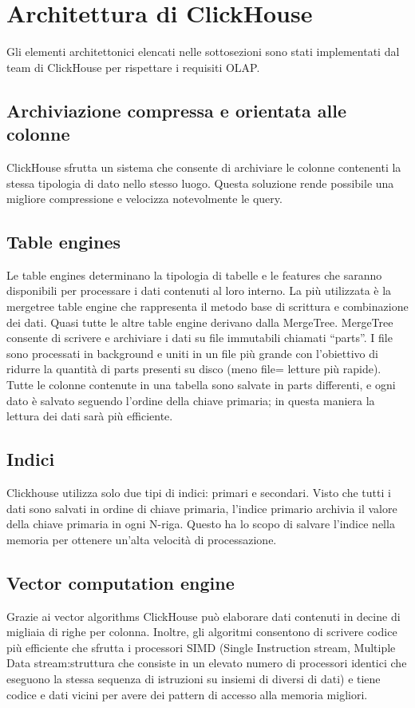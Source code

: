\section{Architettura di ClickHouse}
Gli elementi architettonici elencati nelle sottosezioni sono stati implementati dal team di ClickHouse per rispettare i requisiti OLAP. 
\subsection{Archiviazione compressa e orientata alle colonne}
ClickHouse sfrutta un sistema che consente di archiviare le colonne contenenti la stessa tipologia di dato nello stesso luogo. Questa soluzione rende possibile una migliore compressione e velocizza notevolmente le query.


\subsection{Table engines}
Le table engines determinano la tipologia di tabelle e le features che saranno disponibili per processare i dati contenuti al loro interno.
La più utilizzata è la mergetree table engine che rappresenta il metodo base di scrittura e combinazione dei dati. Quasi tutte le altre table engine derivano dalla MergeTree. 
MergeTree consente di scrivere e archiviare i dati su file immutabili chiamati “parts”. I file sono processati in background e uniti in un file più grande con l’obiettivo di ridurre la quantità di parts presenti su disco (meno file= letture più rapide).
Tutte le colonne contenute in una tabella sono salvate in parts differenti, e ogni dato è salvato seguendo l’ordine della chiave primaria; in questa maniera la lettura dei dati sarà più efficiente.


\subsection{Indici}
Clickhouse utilizza solo due tipi di indici: primari e secondari.
Visto che tutti i dati sono salvati in ordine di chiave primaria, l’indice primario archivia il valore della chiave primaria in ogni N-riga. Questo ha lo scopo di salvare l’indice nella memoria per ottenere un’alta velocità di processazione. 


\subsection{Vector computation engine}
Grazie ai vector algorithms ClickHouse può elaborare dati contenuti in decine di migliaia di righe per colonna. Inoltre, gli algoritmi consentono di scrivere codice più efficiente che sfrutta i processori SIMD (Single Instruction stream, Multiple Data stream:struttura che consiste in un elevato numero di processori identici che eseguono la stessa sequenza di istruzioni su insiemi di diversi di dati) e tiene codice e dati vicini per avere dei pattern di accesso alla memoria migliori.















